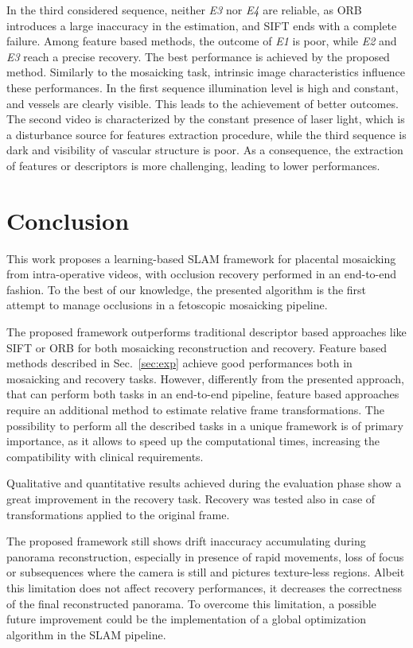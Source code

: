 \documentclass[sn-basic]{sn-jnl}%
\begin{document}
In the third considered sequence, neither \textit{E3} nor \textit{E4} are reliable, as ORB introduces a large inaccuracy in the estimation, and SIFT ends with a complete failure. Among feature based methods, the outcome of \textit{E1} is poor, while \textit{E2} and \textit{E3} reach a precise recovery. The best performance is achieved by the proposed method. Similarly to the mosaicking task, intrinsic image characteristics influence these performances. In the first sequence illumination level is high and constant, and vessels are clearly visible. This leads to the achievement of better outcomes. The second video is characterized by the constant presence of laser light, which is a disturbance source for features extraction procedure, while the third sequence is dark and visibility of vascular structure is poor. As a consequence, the extraction of features or descriptors is more challenging, leading to lower performances.

\section{Conclusion}
\label{sec:conclusion}
This work proposes a learning-based SLAM framework for placental mosaicking from intra-operative videos, with occlusion recovery performed in an end-to-end fashion. To the best of our knowledge, the presented algorithm is the first attempt to manage occlusions in a fetoscopic mosaicking pipeline. 

The proposed framework outperforms traditional descriptor based approaches like SIFT or ORB for both mosaicking reconstruction and recovery.
Feature based methods described in Sec.~\ref{sec:exp} achieve good performances both in mosaicking and recovery tasks. However, differently from the presented approach, that can perform both tasks in an end-to-end pipeline, feature based approaches require an additional method to estimate relative frame transformations. The possibility to perform all the described tasks in a unique framework is of primary importance, as it allows to speed up the computational times, increasing the compatibility with clinical requirements. 

Qualitative and quantitative results achieved during the evaluation phase show a great improvement in the recovery task. Recovery was tested also in case of transformations applied to the original frame. 

The proposed framework still shows drift inaccuracy accumulating during panorama reconstruction, especially in presence of rapid movements, loss of focus or subsequences where the camera is still and pictures texture-less regions. Albeit this limitation does not affect recovery performances, it decreases the correctness of the final reconstructed panorama. To overcome this limitation, a possible future improvement could be the implementation of a global optimization algorithm in the SLAM pipeline.
\end{document}
